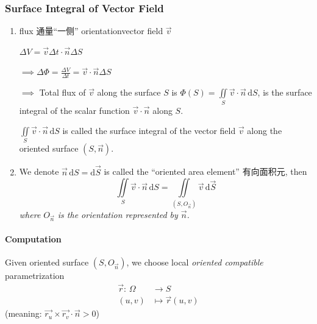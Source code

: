 
\subsubsection[向量场在曲面上的积分的定义和计算]{Surface Integral of Vector Field}

\begin{enumerate}[label=\Roman*]
    \item flux 通量\quad``一侧'' orientation\quad vector field $\overrightarrow{v}$

          $\Delta V=\overrightarrow{v}\Delta t\cdot\overrightarrow{n}\Delta S$

          $\implies\Delta\Phi=\frac{\Delta V}{\Delta t}=\overrightarrow{v}\cdot\overrightarrow{n}\Delta S$

          $\implies$ Total flux of $\overrightarrow{v}$ along the surface $S$ is $\Phi(S)=\iint\limits_S\overrightarrow{v}\cdot\overrightarrow{n}\,\mathrm{d}S$, is the surface integral of the scalar function $\overrightarrow{v}\cdot\overrightarrow{n}$ along $S$.

          $\iint\limits_S\overrightarrow{v}\cdot\overrightarrow{n}\,\mathrm{d}S$ is called the surface integral of the vector field $\overrightarrow{v}$ along the oriented surface $\left(S,\overrightarrow{n}\right)$.

    \item We denote $\overrightarrow{n}\,\mathrm{d}S=\mathrm{d}\overrightarrow{S}$ is called the ``oriented area element'' 有向面积元, then
          $$\iint\limits_S\overrightarrow{v}\cdot\overrightarrow{n}\,\mathrm{d}S=\iint\limits_{\left(S,O_{\overrightarrow{n}}\right)}\overrightarrow{v}\,\mathrm{d}\overrightarrow{S}$$
          \emph{where $O_{\overrightarrow{n}}$ is the orientation represented by $\overrightarrow{n}$.}
\end{enumerate}

\paragraph*{Computation}

Given oriented surface $\left(S,O_{\overrightarrow{n}}\right)$, we choose local \emph{oriented compatible} parametrization
\begin{align*}
    \overrightarrow{r}:\,\Omega & \to S                          \\
    (u,v)                       & \mapsto\overrightarrow{r}(u,v)
\end{align*}
(meaning: $\overrightarrow{r_u}\times\overrightarrow{r_v}\cdot\overrightarrow{n}>0$)


